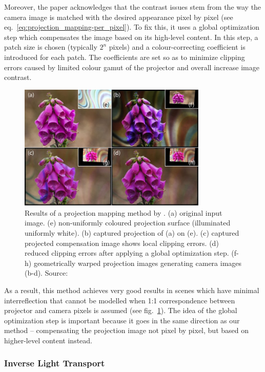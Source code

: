 Moreover, the paper acknowledges that the contrast issues stem from the way the camera image is matched with the desired appearance pixel by pixel (see eq.~\ref{eq:projection_mapping-per_pixel}). To fix this, it uses a global optimization step which compensates the image based on its high-level content. In this step, a patch size is chosen (typically \(2^n\) pixels) and a colour-correcting coefficient is introduced for each patch. The coefficients are set so as to minimize clipping errors caused by limited colour gamut of the projector and overall increase image contrast.

\begin{figure}
    \centering
    \includegraphics[width=0.8\textwidth]{images/02-grundhofer_result.jpg}
    \caption{Results of a projection mapping method by \citet{Grundhofer2015}. (a) original input image. (e) non-uniformly coloured projection surface (illuminated  uniformly white). (b) captured projection of (a) on (e). (c) captured  projected  compensation  image shows local clipping errors. (d) reduced clipping errors after applying a global optimization step. (f-h) geometrically warped projection images generating camera images (b-d). Source: \citet{Grundhofer2015}}
    \label{fig:background_grundhofer_result}
\end{figure}

As a result, this method achieves very good results in scenes which have minimal interreflection that cannot be modelled when 1:1 correspondence between projector and camera pixels is assumed (see fig.~\ref{fig:background_grundhofer_result}). The idea of the global optimization step is important because it goes in the same direction as our method -- compensating the projection image not pixel by pixel, but based on higher-level content instead.

\subsubsection{Inverse Light Transport}
\label{section:background-projection_mapping-procams-inverse_lt}

